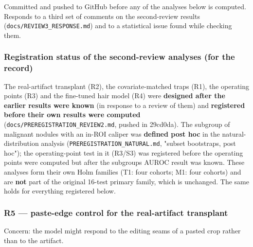 {\small
Committed and pushed to GitHub before any of the analyses below is computed. Responds to a third set of comments on
the second-review results (\texttt{docs/REVIEW3\_RESPONSE.md}) and to a statistical issue found while checking them.

\subsubsection{Registration status of the second-review analyses (for the record)}\label{registration-status-of-the-second-review-analyses-for-the-record}

The real-artifact transplant (R2), the covariate-matched traps (R1), the operating points (R3) and the fine-tuned hair
model (R4) were \textbf{designed after the earlier results were known} (in response to a review of them) and \textbf{registered
before their own results were computed} (\texttt{docs/PREREGISTRATION\_REVIEW2.md}, pushed in 29cd0da). The subgroup of
malignant nodules with an in-ROI caliper was \textbf{defined post hoc} in the natural-distribution analysis
(\texttt{PREREGISTRATION\_NATURAL.md}, "subset bootstraps, post hoc"); the operating-point test in it (R3/S3) was registered
before the operating points were computed but after the subgroup\textquotesingle s AUROC result was known. These analyses form their
own Holm families (T1: four cohorts; M1: four cohorts) and are \textbf{not} part of the original 16-test primary family,
which is unchanged. The same holds for everything registered below.

\subsubsection{R5 --- paste-edge control for the real-artifact transplant}\label{r5--paste-edge-control-for-the-real-artifact-transplant}

Concern: the model might respond to the editing seams of a pasted crop rather than to the artifact.

\begin{itemize}


\end{itemize}}
